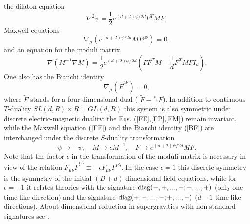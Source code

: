 \documentclass[a4paper,12pt]{article}
\begin{document}
the dilaton equation
\begin{equation} \label{FP}
\nabla^2 \psi = \frac12 e^{(d+2)\psi/2d} F^T M F,
\end{equation}
Maxwell equations
\begin{equation}\label{FF}
\nabla_\mu \left(e^{(d+2)\psi/2d} M F^{\mu\nu}\right) = 0,
\end{equation}
and an equation for the moduli matrix
\begin{equation}\label{FM}
\nabla(M^{-1}\nabla M) = \frac12 e^{(d+2)\psi/2d} \left( FF^TM -
\frac1d F^TMFI_{d}\right).
\end{equation}
One also has the Bianchi identity
\begin{equation}\label{BF}
\nabla_\mu (\widetilde F^{\mu\nu}) = 0,
\end{equation}
where $\widetilde F$ stands for a four-dimensional dual (
$\widetilde F \equiv {}^{*_4}F$). In addition to continuous
$T$-duality $SL(d,R) \times R = GL(d,R)$ this system is also
symmetric under discrete electric-magnetic duality: the Eqs.
(\ref{FE},\ref{FP},\ref{FM}) remain invariant, while the Maxwell
equation (\ref{FF}) and the Bianchi identity (\ref{BF}) are
interchanged under the discrete $S$-duality transformation
\begin{equation}
\psi \to -\psi, \quad M \to \epsilon M^{-1}, \quad F \to
e^{(d+2)\psi/2d} M \widetilde F.
\end{equation}
Note that the factor $\epsilon$ in the transformation of the
moduli matrix is necessary in view of the relation $\widetilde
F_{\mu\nu} \widetilde F^{\nu\lambda} \equiv -\epsilon F_{\mu\nu}
F^{\nu\lambda}$. In the case $\epsilon=1$ this discrete symmetry
is the symmetry of the initial $(D+d)$-dimensional field
equations, while for $\epsilon=-1$ it relates theories with the
signature $\hbox{diag}(-,+,...,+;+,...,+)$ (only one time-like
direction) and the signature $\hbox{diag}(+,-,...,-;+,...,+)$
($d-1$ time-like directions). About dimensional reduction in
supergravities with non-standard signatures see
\cite{Bar97,Nish98}.
\end{document}
